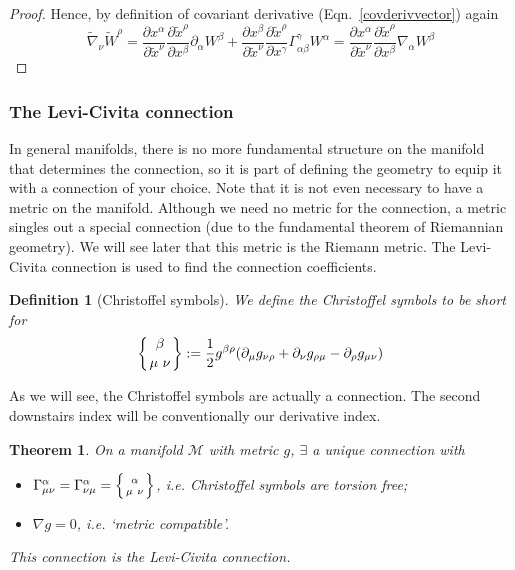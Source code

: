 \documentclass[a4paper]{article}
\theoremstyle{new}
\newtheorem{defi}{Definition}[section]
\newtheorem{thm}{Theorem}[section]
\begin{document}
\begin{proof}
Hence, by definition of covariant derivative (Eqn.~\ref{covderivvector}) again
$$\tilde{\nabla}_\nu\tilde{W}^\rho=\frac{\partial x^\alpha}{\partial\tilde{x}^\nu}\frac{\partial\tilde{x}^\rho}{\partial x^\beta}\partial_\alpha W^\beta+\frac{\partial x^\beta}{\partial\tilde{x}^\nu}\frac{\partial\tilde{x}^\rho}{\partial x^\gamma}\Gamma_{\alpha\beta}^\gamma W^\alpha=\frac{\partial x^\alpha}{\partial\tilde{x}^\nu}\frac{\partial\tilde{x}^\rho}{\partial x^\beta}\nabla_\alpha W^\beta$$
\end{proof}
\subsubsection{The Levi-Civita connection}
In general manifolds, there is no more fundamental structure on the manifold that determines the connection, so it is part of defining the geometry to equip it with a connection of your choice. Note that it is not even necessary to have a metric on the manifold. Although we need no metric for the connection, a metric singles out a special connection (due to the fundamental theorem of Riemannian geometry). We will see later that this metric is the Riemann metric. The Levi-Civita connection is used to find the connection coefficients.
\begin{defi}[Christoffel symbols]
We define the Christoffel symbols to be short for
\begin{equation}
\left \{ {\beta \atop
\mu\ \nu}\right \}:=\frac{1}{2}g^{\beta\rho}(\partial_\mu g_{\nu\rho}+\partial_\nu g_{\rho\mu}-\partial_\rho g_{\mu\nu})\label{Christoffel}
\end{equation}
\end{defi}
As we will see, the Christoffel symbols are actually a connection. The second downstairs index will be conventionally our derivative index.
\begin{thm}
On a manifold $\mathcal{M}$ with metric $g$, $\exists$ a unique connection with
\begin{itemize}
    \item $\Gamma_{\mu\nu}^\alpha=\Gamma_{\nu\mu}^\alpha=\left \{ {\alpha \atop
\mu\ \nu}\right \}$, i.e. Christoffel symbols are torsion free;
    \item $\nabla g=0$, i.e. `metric compatible'.
\end{itemize}
This connection is the Levi-Civita connection.
\end{thm}
\end{document}
